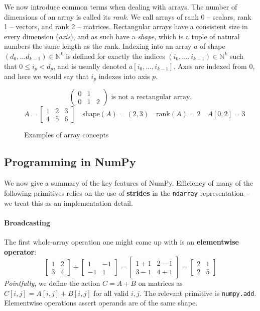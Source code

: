 We now introduce common terms when dealing with arrays. The number of dimensions of an array is called its \textit{rank}. We call arrays of rank 0  -- scalars, rank 1 -- vectors, and rank 2 -- matrices. Rectangular arrays have a consistent size in every dimension (\textit{axis}), and as such have a \textit{shape}, which is a tuple of natural numbers the same length as the rank. Indexing into an array $a$ of shape $(d_0, ... d_{k-1}) \in \mathbb{N}^k$ is defined for exactly the indices $(i_0, ..., i_{k-1}) \in \mathbb{N}^k$ such that $0 \le i_p < d_p$, and is usually denoted $a[i_0, ..., i_{k-1}]$. Axes are indexed from 0, and here we would say that $i_p$ indexes into axis $p$.
\begin{figure}[h]
    \centering
    $$ \begin{pmatrix}
    0 & 1 & \\
    0 & 1 & 2
    \end{pmatrix} \text{ is not a rectangular array.} $$
    $$ A = \begin{bmatrix}
        1 & 2 & 3 \\ 
        4 & 5 & 6
    \end{bmatrix} \quad \mathrm{shape}(A) = (2, 3)  \quad \mathrm{rank}(A) = 2 \quad A[0, 2] = 3 $$
    \caption{Examples of array concepts}
    \label{fig:array-examples}
\end{figure}

\subsection{Programming in NumPy} 

We now give a summary of the key features of NumPy. Efficiency of many of the following primitives relies on the use of \textbf{strides} in the \texttt{ndarray} representation \cite{harris2020array} -- we treat this as an implementation detail.

\paragraph{Broadcasting}

The first whole-array operation one might come up with is an \textbf{elementwise operator}:
$$ \begin{bmatrix} 1 & 2 \\ 3 & 4 \end{bmatrix} 
+ \begin{bmatrix}1 & -1 \\ -1 & 1 \end{bmatrix}
= \begin{bmatrix}1 + 1 & 2 - 1 \\ 3 - 1 & 4 + 1 \end{bmatrix}
= \begin{bmatrix}2 & 1 \\ 2 & 5 \end{bmatrix} $$
\textit{Pointfully}, we define the action $C = A + B$ on matrices as $C[i, j] = A[i, j] + B[i, j]$ for all valid $i, j$. The relevant primitive is \texttt{numpy.add}. Elementwise operations assert operands are of the same shape.

